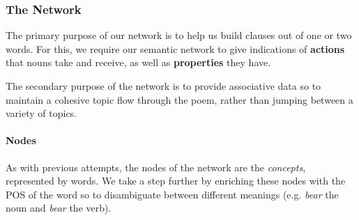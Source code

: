 \subsubsection{The Network}
The primary purpose of our network is to help us build clauses out of one or two words. For this, we require our semantic network to give indications of \textbf{actions} that nouns take and receive, as well as \textbf{properties} they have.

The secondary purpose of the network is to provide associative data so to maintain a cohesive topic flow through the poem, rather than jumping between a variety of topics. 

\paragraph{Nodes}
As with previous attempts, the nodes of the network are the \textit{concepts}, represented by words. We take a step further by enriching these nodes with the POS of the word so to disambiguate between different meanings (e.g. \textit{bear} the noun and \textit{bear} the verb).

